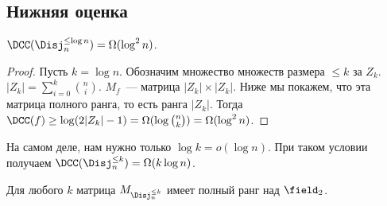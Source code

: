 \subsection{Нижняя оценка}

\begin{theorem}
    $\DCC(\Disj^{\le \log n}_n) = \Omega(\log^2 n)$.
\end{theorem}

\begin{proof}
    Пусть $k = \log n$. Обозначим множество множеств размера $\le k$ за $Z_k$.
    $|Z_k| = \sum\limits_{i = 0}^k \binom{n}{i}$. $M_{f}$~--- матрица $|Z_k| \times |Z_k|$. Ниже мы
    покажем, что эта матрица полного ранга, то есть ранга $|Z_k|$. Тогда $\DCC(f) \ge \log(2|Z_k| - 1) =
    \Omega(\log \binom{n}{k}) = \Omega(\log^2 n)$. 
\end{proof}

\begin{remark}
    На самом деле, нам нужно только $\log k = o(\log n)$. При таком условии получаем $\DCC(\Disj^{\le
        k}_n) = \Omega(k \log n)$.
\end{remark}

\begin{theorem}[Разборов]
    Для любого $k$ матрица $M_{\Disj^{\le k}_n}$ имеет полный ранг над $\field_2$.
\end{theorem}


